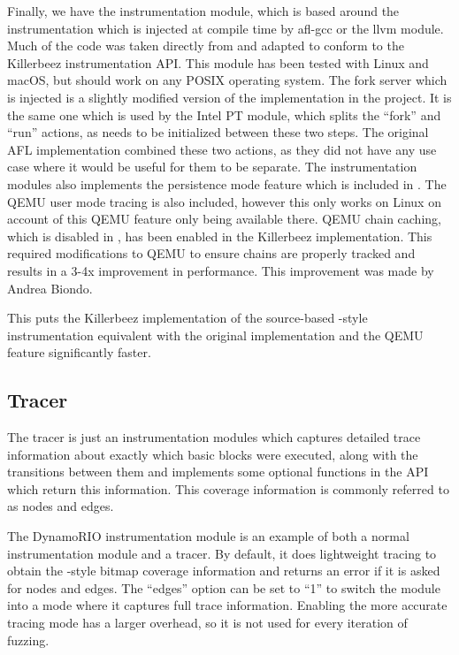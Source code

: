 Finally, we have the \AFL{} instrumentation module, which is based around the
instrumentation which is injected at compile time by afl-gcc or the \AFL{}
llvm module. Much of the code was taken directly from \AFL{} and adapted to
conform to the Killerbeez instrumentation API. This module has been tested
with Linux and macOS, but should work on any POSIX operating system.
The fork server which is injected is a slightly modified version of the
implementation in the \AFL{} project. It is the same one which is used by the
Intel PT module, which splits the ``fork'' and ``run'' actions, as \IPT{} needs
to be initialized between these two steps.  The original AFL implementation
combined these two actions, as they did not have any use case where it would
be useful for them to be separate.  The \AFL{} instrumentation modules also
implements the persistence mode feature
which is included in \AFL{}.  The QEMU user mode tracing is also included,
however this only works on Linux on account of this QEMU feature only being
available there.  QEMU chain caching, which is disabled in \AFL{},
has been enabled in the Killerbeez implementation. This required modifications
to QEMU to ensure chains are properly tracked and results in a 3-4x improvement
in performance. This improvement was made by Andrea Biondo.\cite{qemuspeedup}

This puts the Killerbeez implementation of the source-based \AFL{}-style
instrumentation equivalent with the original implementation and the QEMU
feature significantly faster.

\subsection{Tracer} \label{Tracer}
The tracer is just an instrumentation modules which captures detailed trace
information about exactly which basic blocks were executed, along with the
transitions between them and implements some optional functions in the API
which return this information.  This coverage information is commonly referred
to as nodes and edges.

The DynamoRIO instrumentation module is an example of both a normal
instrumentation module and a tracer. By default, it does lightweight tracing to
obtain the \AFL{}-style bitmap coverage information and returns an error if it
is asked for nodes and edges. The ``edges'' option can be set to ``1'' to
switch the module into a mode where it captures full trace information.
Enabling the more accurate tracing mode has a larger overhead, so it is not
used for every iteration of fuzzing.

